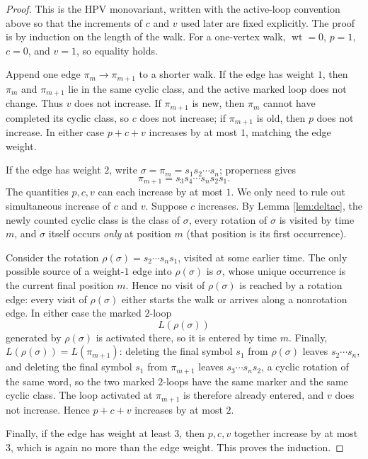 \documentclass[11pt]{article}
\DeclareMathOperator{\wt}{wt}
\begin{document}
\begin{proof}
This is the HPV monovariant, written with the active-loop convention above so that the increments
of \(c\) and \(v\) used later are fixed explicitly.
The proof is by induction on the length of the walk.  For a one-vertex walk, \(\wt=0\),
\(p=1\), \(c=0\), and \(v=1\), so equality holds.

Append one edge \(\pi_m\to \pi_{m+1}\) to a shorter walk.  If the edge has weight \(1\), then
\(\pi_m\) and \(\pi_{m+1}\) lie in the same cyclic class, and the active marked loop does not
change.  Thus \(v\) does not increase.  If \(\pi_{m+1}\) is new, then
\(\pi_m\) cannot have completed its cyclic class, so
\(c\) does not increase; if \(\pi_{m+1}\) is old, then \(p\) does not increase.  In either case
\(p+c+v\) increases by at most \(1\), matching the edge weight.

If the edge has weight \(2\), write \(\sigma=\pi_m=s_1s_2\cdots s_n\); properness gives
\[
  \pi_{m+1}=s_3s_4\cdots s_ns_2s_1.
\]
The quantities \(p,c,v\) can each increase by at most \(1\).  We only need to rule out simultaneous
increase of \(c\) and \(v\).  Suppose \(c\) increases.  By Lemma \ref{lem:deltac}, the newly
counted cyclic class is the class of \(\sigma\), every rotation of \(\sigma\) is visited by time
\(m\), and \(\sigma\) itself occurs \emph{only} at position \(m\) (that position is its first
occurrence).

Consider the rotation \(\rho(\sigma)=s_2\cdots s_ns_1\), visited at some earlier time.  The only
possible source of a weight-\(1\) edge into \(\rho(\sigma)\) is \(\sigma\), whose unique
occurrence is the current final position \(m\).  Hence no visit of \(\rho(\sigma)\) is reached by
a rotation edge: every visit of \(\rho(\sigma)\) either starts the walk or arrives along a
nonrotation edge.  In either case the marked \(2\)-loop
\[
  L(\rho(\sigma))
\]
generated by \(\rho(\sigma)\) is activated there, so it is entered by time \(m\).  Finally,
\(L(\rho(\sigma))=L(\pi_{m+1})\): deleting the final symbol \(s_1\) from \(\rho(\sigma)\) leaves
\(s_2\cdots s_n\), and deleting the final symbol \(s_1\) from \(\pi_{m+1}\) leaves
\(s_3\cdots s_ns_2\), a cyclic rotation of the same word, so the two marked \(2\)-loops have the
same marker and the same cyclic class.  The loop activated at \(\pi_{m+1}\) is therefore already
entered, and \(v\) does not increase.  Hence \(p+c+v\) increases by at most \(2\).

Finally, if the edge has weight at least \(3\), then \(p,c,v\) together increase by at most \(3\),
which is again no more than the edge weight.  This proves the induction.
\end{proof}
\end{document}
